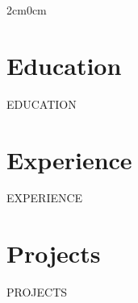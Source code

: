 \documentclass[10pt, a4paper]{article}
\begin{document}
\begin{adjustwidth}{2cm}{0cm}

\vspace{0.10cm}
\section{Education}
{{EDUCATION}}

\vspace{0.10cm}
\section{Experience}
{{EXPERIENCE}}

\vspace{0.10cm}
\section{Projects}
{{PROJECTS}}

\end{adjustwidth}
\end{document}
